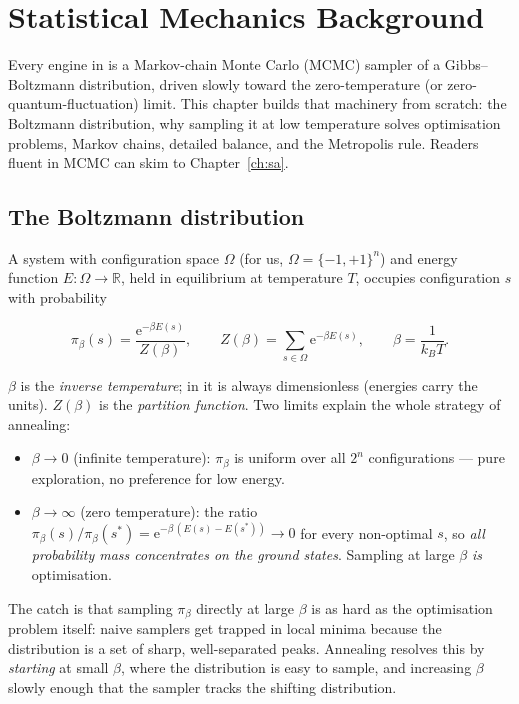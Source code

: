 \chapter{Statistical Mechanics Background}
\label{ch:statmech}

Every engine in \qv{} is a Markov-chain Monte Carlo (MCMC) sampler of a
Gibbs--Boltzmann distribution, driven slowly toward the zero-temperature (or
zero-quantum-fluctuation) limit. This chapter builds that machinery from
scratch: the Boltzmann distribution, why sampling it at low temperature
solves optimisation problems, Markov chains, detailed balance, and the
Metropolis rule. Readers fluent in MCMC can skim to
Chapter~\ref{ch:sa}.

\section{The Boltzmann distribution}

A system with configuration space $\Omega$ (for us,
$\Omega=\{-1,+1\}^n$) and energy function $E:\Omega\to\mathbb{R}$, held in
equilibrium at temperature $T$, occupies configuration $s$ with probability

\begin{keyeq}
\begin{equation}
\pi_\beta(s)=\frac{\mathrm{e}^{-\beta E(s)}}{Z(\beta)},
\qquad
Z(\beta)=\sum_{s\in\Omega}\mathrm{e}^{-\beta E(s)},
\qquad
\beta=\frac{1}{k_BT}.
\label{eq:boltzmann}
\end{equation}
\end{keyeq}

$\beta$ is the \emph{inverse temperature}; in \qv{} it is always
dimensionless (energies carry the units). $Z(\beta)$ is the \emph{partition
function}. Two limits explain the whole strategy of annealing:

\begin{itemize}
\item $\beta\to0$ (infinite temperature): $\pi_\beta$ is uniform over all
$2^n$ configurations --- pure exploration, no preference for low energy.
\item $\beta\to\infty$ (zero temperature): the ratio
$\pi_\beta(s)/\pi_\beta(s^\ast)=\mathrm{e}^{-\beta\,(E(s)-E(s^\ast))}\to0$
for every non-optimal $s$, so \emph{all probability mass concentrates on the
ground states}. Sampling at large $\beta$ \emph{is} optimisation.
\end{itemize}

The catch is that sampling $\pi_\beta$ directly at large $\beta$ is as hard
as the optimisation problem itself: naive samplers get trapped in local
minima because the distribution is a set of sharp, well-separated peaks.
Annealing resolves this by \emph{starting} at small $\beta$, where the
distribution is easy to sample, and increasing $\beta$ slowly enough that the
sampler tracks the shifting distribution.

